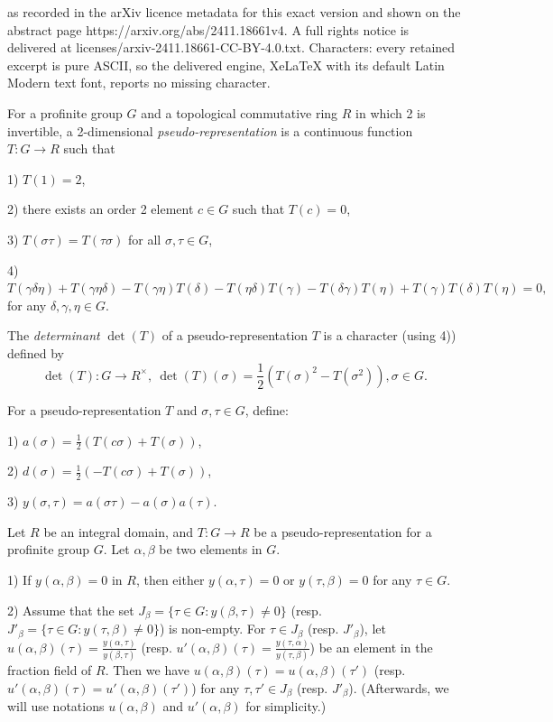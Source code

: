 \documentclass[10pt,a4paper]{amsart}
\begin{document}
as recorded in the arXiv licence metadata for this exact version and shown on the abstract page https://arxiv.org/abs/2411.18661v4. A full rights notice is delivered at licenses/arxiv-2411.18661-CC-BY-4.0.txt. Characters: every retained excerpt is pure ASCII, so the delivered engine, XeLaTeX with its default Latin Modern text font, reports no missing character.
\begin{defn} \label{pseudo}
	For a profinite group $G$ and a topological commutative ring $R$ in which 2 is invertible, a 2-dimensional \textit{pseudo-representation} is a continuous function $T: G \to R$ such that 
	
	1) $T(1)=2$,
	
	2) there exists an order 2 element $c \in G$ such that $T(c)=0$,
	
	3) $T(\sigma \tau)=T(\tau \sigma)$ for all $ \sigma, \tau \in G$,
	
	4) $T(\gamma \delta \eta)+T(\gamma \eta \delta)-T(\gamma \eta)T(\delta)-T(\eta \delta)T(\gamma)-T(\delta \gamma)T(\eta)+T(\gamma)T(\delta)T(\eta)=0,$
	for any $\delta, \gamma,\eta\in G$.
	
	The \textit{determinant} $\operatorname{det}(T)$ of a pseudo-representation $T$ is a character (using 4)) defined by $$ \operatorname{det}(T): G \to R^\times, ~
	\operatorname{det}(T)(\sigma)=\frac{1}{2}(T(\sigma)^2-T(\sigma^2)), \sigma \in G.$$
	
	
	
	For a pseudo-representation $T$ and $\sigma, \tau \in G$, define:
	
	1) $a(\sigma)=\frac{1}{2}(T(c\sigma)+T(\sigma))$,
	
	2) $d(\sigma)=\frac{1}{2}(-T(c\sigma)+T(\sigma))$,
	
	3) $y(\sigma, \tau)=a(\sigma \tau)-a(\sigma)a(\tau).$
\end{defn}

\begin{prop}\label{u}
	Let $R$ be an integral domain, and $T: G \to R$ be a pseudo-representation for a profinite group $G$. Let $\alpha, \beta $ be two elements in $ G$.
	
	1) If $y(\alpha, \beta) =0$ in $R$, then either $y(\alpha, \tau)=0$ or $y(\tau, \beta)=0$ for any $\tau \in G$.
	
	2) Assume that the set $J_{\beta} =\{\tau \in G : y(\beta, \tau)\ne 0\}$ (resp. $J'_{\beta} =\{\tau \in G : y(\tau, \beta) \ne 0\}$) is non-empty. For $\tau \in J_{\beta}$ (resp. $J'_{\beta}$), let $u(\alpha, \beta)(\tau)= \frac{y(\alpha, \tau)}{y(\beta, \tau)}$ (resp. $u'(\alpha, \beta)(\tau)=\frac{y(\tau, \alpha)}{y(\tau, \beta)}$) be an element in the fraction field of $R$. Then we have $u(\alpha, \beta)(\tau)=u(\alpha, \beta)(\tau')$ (resp. $u'(\alpha, \beta)(\tau)=u'(\alpha, \beta)(\tau')$)  for any $\tau, \tau' \in J_\beta$ (resp. $J'_{\beta}$). (Afterwards, we will use notations $u(\alpha, \beta)$ and $u'(\alpha, \beta)$ for simplicity.)
\end{prop}
\end{document}
